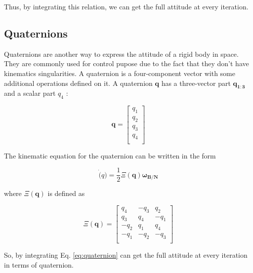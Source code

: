 \documentclass[11pt,a4paper]{report}
\begin{document}
Thus, by integrating this relation, we can get the full attitude at every iteration.

\subsection{Quaternions}
Quaternions are another way to express the attitude of a rigid body in space. They are commonly used for control pupose due to the fact that they don't have kinematics singularities.
A quaternion is a four-component vector with some additional operations defined on it. A quaternion $\mathbf{q}$ has a three-vector part $\mathbf{q_{1:3}}$ and a scalar part $q_{4}$ : 

\begin{equation*}
 \mathbf{q} =
                                \begin{bmatrix}
                                    q_{1}\\
                                    q_{2}\\
                                    q_{3}\\
                                    q_{4}\\
                                \end{bmatrix}
\end{equation*}

The kinematic equation for the quaternion can be written in the form

\begin{equation}
 \label{eq:quaternion}
 \dot(q) = \frac{1}{2} \mathbf{\varXi(\mathbf{q})} \mathbf{\omega_{B/N}}
\end{equation}

where $\mathbf{\varXi(\mathbf{q})}$ is defined as 

\begin{equation*}
 \mathbf{\varXi(\mathbf{q})} =
                                \begin{bmatrix}
                                   q_4 & -q_3 & q_2\\
                                   q_3 & q_4 & -q_1\\
                                  -q_2 & q_1 & q_4\\
                                  -q_1 & -q_2 & -q_3\\
                                \end{bmatrix}
\end{equation*}

So, by integrating Eq. \ref{eq:quaternion} can get the full attitude at every iteration in terms of quaternion.
\end{document}
